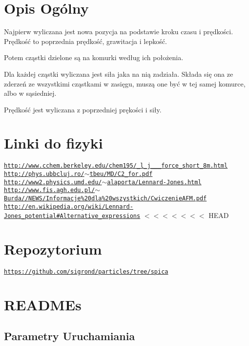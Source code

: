 \hypertarget{index_Opis_Ogólny}{}\section{Opis Ogólny}\label{index_Opis_Ogólny}

\begin{DoxyItemize}
\item Najpierw wyliczana jest nowa pozycja na podstawie kroku czasu i prędkości. Prędkość to poprzednia prędkość, grawitacja i lepkość.
\item Potem cząstki dzielone są na komurki według ich położenia.
\item Dla każdej cząstki wyliczana jest siła jaka na nią zadziała. Składa się ona ze zderzeń ze wszystkimi cząstkami w zasięgu, muszą one być w tej samej komurce, albo w sąsiedniej.
\item Prędkość jest wyliczana z poprzedniej prękości i siły. 
\end{DoxyItemize}\hypertarget{index_linki_do_fizyki}{}\section{Linki do fizyki}\label{index_linki_do_fizyki}
\href{http://www.cchem.berkeley.edu/chem195/_l_j___force_short_8m.html}{\tt http\-://www.\-cchem.\-berkeley.\-edu/chem195/\-\_\-l\-\_\-j\-\_\-\-\_\-\-\_\-force\-\_\-short\-\_\-8m.\-html} \href{http://phys.ubbcluj.ro/~tbeu/MD/C2_for.pdf}{\tt http\-://phys.\-ubbcluj.\-ro/$\sim$tbeu/\-M\-D/\-C2\-\_\-for.\-pdf} \href{http://www2.physics.umd.edu/~alaporta/Lennard-Jones.html}{\tt http\-://www2.\-physics.\-umd.\-edu/$\sim$alaporta/\-Lennard-\/\-Jones.\-html} \href{http://www.fis.agh.edu.pl/~Burda//NEWS/Informacje%20dla%20wszystkich/CwiczenieAFM.pdf}{\tt http\-://www.\-fis.\-agh.\-edu.\-pl/$\sim$\-Burda//\-N\-E\-W\-S/\-Informacje\%20dla\%20wszystkich/\-Cwiczenie\-A\-F\-M.\-pdf} \href{http://en.wikipedia.org/wiki/Lennard-Jones_potential#Alternative_expressions}{\tt http\-://en.\-wikipedia.\-org/wiki/\-Lennard-\/\-Jones\-\_\-potential\#\-Alternative\-\_\-expressions} $<$$<$$<$$<$$<$$<$$<$ H\-E\-A\-D \hypertarget{index_Repozytorium}{}\section{Repozytorium}\label{index_Repozytorium}
\href{https://github.com/sigrond/particles/tree/spica}{\tt https\-://github.\-com/sigrond/particles/tree/spica} \hypertarget{index_READMEs}{}\section{R\-E\-A\-D\-M\-Es}\label{index_READMEs}
\hypertarget{index_parametry_uruchamiania}{}\subsection{Parametry Uruchamiania}\label{index_parametry_uruchamiania}

